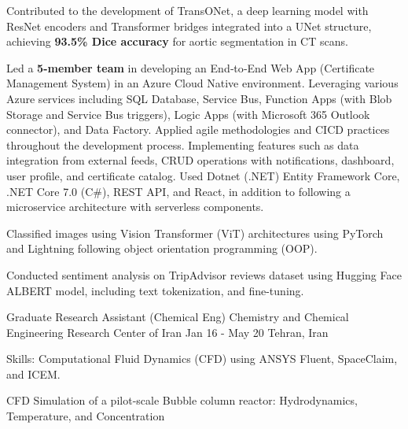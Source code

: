 \begin{cventries}
{\begin{cvitemsfree}
                \item{Contributed to the development of TransONet, a deep learning model with ResNet encoders and Transformer bridges integrated into a UNet structure, achieving \textbf{93.5\% Dice accuracy} for aortic segmentation in CT scans.}
                \item{Led a \textbf{5-member team} in developing an End‑to‑End Web App (Certificate Management System) in an Azure Cloud Native environment. Leveraging various Azure services including SQL Database, Service Bus, Function Apps (with Blob Storage and Service Bus triggers), Logic Apps (with Microsoft 365 Outlook connector), and Data Factory. Applied agile methodologies and CI\/CD practices throughout the development process. Implementing features such as data integration from external feeds, CRUD operations with notifications, dashboard, user profile, and certificate catalog. Used Dotnet (.NET) Entity Framework Core, .NET Core 7.0 (C\#), REST API, and React, in addition to following a microservice architecture with serverless components.}
                \item{Classified images using Vision Transformer (ViT) architectures using PyTorch and Lightning following object orientation programming (OOP).}
                \item{Conducted sentiment analysis on TripAdvisor reviews dataset using Hugging Face ALBERT model, including text tokenization, and fine-tuning.}
            \end{cvitemsfree}
        }
    \cventry
        {Graduate Research Assistant (Chemical Eng)} %
        {Chemistry and Chemical Engineering Research Center of Iran} %
        {Jan 16 - May 20} %
        {Tehran, Iran} %
        {
            \begin{cvitemsfree} %
                \item{Skills: Computational Fluid Dynamics (CFD) using ANSYS Fluent, SpaceClaim, and ICEM.}
                \item{CFD Simulation of a pilot-scale Bubble column reactor: Hydrodynamics, Temperature, and Concentration}

\end{cvitemsfree}}
\end{cventries}
